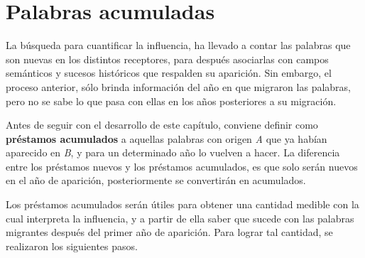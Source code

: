 \chapter{Palabras acumuladas}

La búsqueda para cuantificar la influencia, ha llevado a contar las palabras
que son nuevas en los distintos receptores, para después asociarlas con  campos
semánticos y sucesos históricos que respalden su aparición. Sin embargo, el
proceso anterior, sólo brinda información del año en que migraron las palabras,
pero no se sabe lo que pasa con ellas en los años posteriores a su migración. 

Antes de seguir con el desarrollo de este capítulo, conviene definir como
\textbf{préstamos acumulados} a aquellas palabras con origen \textit{A} que ya
habían aparecido en \textit{B}, y para un determinado año lo vuelven a hacer.
La diferencia entre los préstamos nuevos y los préstamos acumulados, es que
solo serán nuevos en el año de aparición, posteriormente se convertirán en
acumulados.

Los préstamos acumulados serán útiles para obtener una cantidad medible con la
cual interpreta la influencia, y a partir de ella saber que sucede con las
palabras migrantes después del primer año de aparición.  Para lograr tal
cantidad, se realizaron los siguientes pasos.



